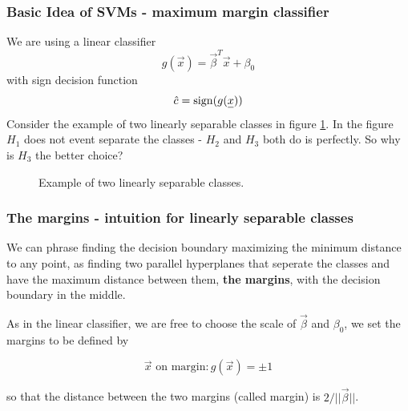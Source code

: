 \subsubsection{Basic Idea of SVMs - maximum margin classifier}
We are using a linear classifier
\begin{equation}
    g(\vec{x}) = \vec{\beta}^T \vec{x} + \beta_0
\end{equation}
with sign decision function
\begin{equation}
    \hat{c} = \sign(g(\vec{x}))
\end{equation}
Consider the example of two linearly separable classes in figure \ref{fig:svm_simple}. In the figure
$H_1$ does not event separate the classes - $H_2$ and $H_3$ both do is perfectly. So why is
$H_3$ the better choice?

\begin{figure}[!htb]
    \centering
    
    \caption{Example of two linearly separable classes.}
    \label{fig:svm_simple}
\end{figure}


\subsubsection{The margins - intuition for linearly separable classes}
We can phrase finding the decision boundary maximizing the minimum distance to any point,
as finding two parallel hyperplanes that seperate the classes and have the maximum distance
between them, \textbf{the margins}, with the decision boundary in the middle.

As in the linear classifier, we are free to choose the scale of $\vec{\beta}$ and $\beta_0$,
we set the margins to be defined by

\begin{equation}
    \vec{x} \text{ on margin}: g(\vec{x}) = \pm 1
\end{equation}

so that the distance between the two margins (called margin) is $2 / ||\vec{\beta}||$.



